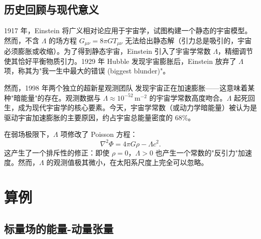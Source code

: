 \subsection{历史回顾与现代意义}

\begin{note}
1917 年，Einstein 将广义相对论应用于宇宙学，试图构建一个静态的宇宙模型。然而，不含 $\Lambda$ 的场方程 $G_{\mu\nu} = 8\pi G T_{\mu\nu}$ 无法给出静态解（引力总是吸引的，宇宙必须膨胀或收缩）。为了得到静态宇宙，Einstein 引入了宇宙学常数 $\Lambda$，精细调节使其恰好平衡物质引力。1929 年 Hubble 发现宇宙膨胀后，Einstein 放弃了 $\Lambda$ 项，称其为"我一生中最大的错误 (biggest blunder)"。

然而，1998 年两个独立的超新星观测团队 \cite{Riess1998} 发现宇宙正在加速膨胀——这意味着某种"暗能量"的存在。观测数据与 $\Lambda \approx 10^{-52}\,\text{m}^{-2}$ 的宇宙学常数高度吻合。$\Lambda$ 起死回生，成为现代宇宙学的核心要素。今天，宇宙学常数（或动力学暗能量）被认为是驱动宇宙加速膨胀的主要原因，约占宇宙总能量密度的 $68\%$。
\end{note}

\begin{property}
在弱场极限下，$\Lambda$ 项修改了 Poisson 方程：
\begin{equation}
    \nabla^2 \Phi = 4\pi G\rho - \Lambda c^2.
\end{equation}
这产生了一个排斥性的修正：即使 $\rho = 0$，$\Lambda > 0$ 也产生一个常数的"反引力"加速度。然而，$\Lambda$ 的观测值极其微小，在太阳系尺度上完全可以忽略。
\end{property}

\section{算例}
\label{sec:examples}

\subsection{标量场的能量-动量张量}

